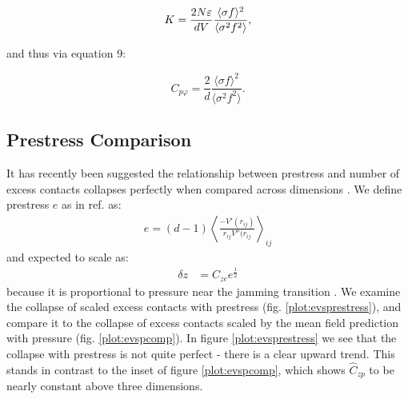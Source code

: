 \begin{equation}
K = \frac{2 N \varepsilon}{ d V}  \frac{\langle \sigma f \rangle^2}{\langle \sigma^2 f^2 \rangle},
\end{equation}

and thus via equation 9:

\begin{equation}
    C_{p\varphi} = \frac{2}{d} \frac{ \langle \sigma f \rangle^2}{\langle \sigma^2 f^2 \rangle}.\label{eqn:seanPredictionSupp}
\end{equation}

\subsection{Prestress Comparison}

It has recently been suggested the relationship between prestress and number of excess contacts collapses perfectly when compared across dimensions \cite{shimada_low-frequency_2019}. We define prestress $e$ as in ref. \cite{shimada_low-frequency_2019} as:
%
\begin{align}
 e = \left(d-1\right) \left\langle \frac{-V'(r_{ij})}{r_{ij}V''(r_{ij}} \right\rangle_{ij}
\end{align}
%
and expected to scale as:
%
\begin{align}
 \delta z &= C_{ze} e^\frac{1}{2} \label{sup_eqn:evsprestress}
\end{align}
%
because it is proportional to pressure near the jamming transition \cite{shimada_low-frequency_2019}. We examine the collapse of scaled excess contacts with prestress (fig. \ref{plot:evsprestress}), and compare it to the collapse of excess contacts scaled by the mean field prediction with pressure (fig. \ref{plot:evspcomp}). In figure \ref{plot:evsprestress} we see that the collapse with prestress is not quite perfect - there is a clear upward trend. This stands in contrast to the inset of figure \ref{plot:evspcomp}, which shows $\hat{C}_{zp}$ to be nearly constant above three dimensions.


